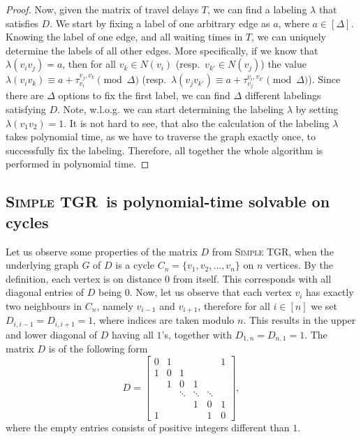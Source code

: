 \documentclass[11pt,a4paper]{article}
\theoremstyle{remark}
\theoremstyle{definition}
\newcommand{\deltaExact}{\textsc{Simple TGR}}
\begin{document}
\begin{proof}
    Now, given the matrix of travel delays $T$, we can find a labeling $\lambda$ that satisfies $D$.
    We start by fixing a label of one arbitrary edge as $a$, where $a \in [\Delta]$.
    Knowing the label of one edge, and all waiting times in $T$, we can uniquely determine the labels of all other edges.
    More specifically, if we know that $\lambda(v_i v_j) = a$, then for all $v_k \in N(v_i)$ (resp.~$v_{k'} \in N(v_j)$)
    the value $\lambda(v_iv_k) \equiv a + \tau_{v_i}^{v_j,v_k} \pmod \Delta $ (resp.~$\lambda(v_j v_{k'}) \equiv a + \tau_{v_j}^{v_i,v_{k'}} \pmod \Delta $).
    Since there are $\Delta$ options to fix the first label, we can find $\Delta$ different labelings satisfying $D$.
    Note, w.l.o.g. we can start determining the labeling $\lambda$ by setting $\lambda(v_1v_2) = 1$.
    It is not hard to see, that also the calculation of the labeling $\lambda$ takes polynomial time, as we have to traverse the graph exactly once, to successfully fix the labeling. Therefore, all together the whole algorithm is performed in polynomial time.
\end{proof}

\subsection{ \deltaExact\
is polynomial-time solvable on cycles}

Let us observe some properties of the matrix $D$ from \deltaExact, when the underlying graph $G$ of $D$ is a cycle $C_n = \{v_1, v_2, \dots, v_n\}$  on $n$ vertices.
By the definition, each vertex is on distance $0$ from itself. This corresponds with all diagonal entries of $D$ being $0$.
Now, let us observe that each vertex $v_i$ has exactly two neighbours in $C_n$, namely $v_{i-1}$ and $v_{i+1}$,
therefore for all $i\in [n]$ we set $D_{i,i-1} = D_{i, i+1} = 1$, where indices are taken modulo $n$.
This results in the upper and lower diagonal of $D$ having all $1$'s, together with $D_{1,n} = D_{n,1} = 1$.
The matrix $D$ is of the following form
\begin{equation} \label{eq:D-matrixForCycles}
  D = 
  \begin{bmatrix}
    0 & 1 &  &  &  & 1\\
    1 & 0 & 1 &  &  & \\
    & 1 & 0 & 1 & & \\
    & & \ddots & \ddots & \ddots &   \\
    &   & &1 &  0 & 1\\ 
    1 &  &  &  &1 &  0 
  \end{bmatrix},
\end{equation}
where the empty entries consists of positive integers different than $1$.
\end{document}
